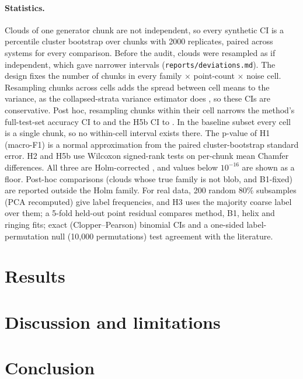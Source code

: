 \documentclass[10pt]{article}
\begin{document}
\paragraph{Statistics.} Clouds of one generator chunk are not independent, so every synthetic CI is a percentile cluster bootstrap over chunks \citep{field2007bootstrap} with 2000 replicates, paired across systems for every comparison. Before the audit, clouds were resampled as if independent, which gave narrower intervals (\texttt{reports/deviations.md}). The design fixes the number of chunks in every family $\times$ point-count $\times$ noise cell. Resampling chunks across cells adds the spread between cell means to the variance, as the collapsed-strata variance estimator does \citep{mosaferi2015collapsed}, so these CIs are conservative. Post hoc, resampling chunks within their cell narrows the method's full-test-set accuracy CI to \accCIMethodStrat{} and the H5b CI to \ciHfivebStrat{}. In the baseline subset every cell is a single chunk, so no within-cell interval exists there. The p-value of H1 (macro-F1) is a normal approximation from the paired cluster-bootstrap standard error. H2 and H5b use Wilcoxon signed-rank tests on per-chunk mean Chamfer differences. All three are Holm-corrected \citep{holm1979}, and values below $10^{-16}$ are shown as a floor. Post-hoc comparisons (clouds whose true family is not blob, and B1-fixed) are reported outside the Holm family. For real data, 200 random 80\% subsamples (PCA recomputed) give label frequencies, and H3 uses the majority coarse label over them; a 5-fold held-out point residual compares method, B1, helix and ringing fits; exact (Clopper--Pearson) binomial CIs and a one-sided label-permutation null (10{,}000 permutations) test agreement with the literature.

\section{Results}
\label{sec:results}


\section{Discussion and limitations}


\section{Conclusion}

\end{document}

